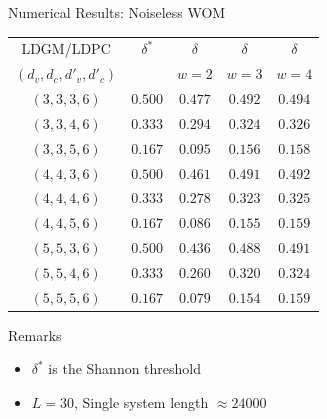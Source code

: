 \documentclass[10pt]{beamer}
\begin{document}
\begin{frame}{Numerical Results: Noiseless WOM}
\begin{center}
\begin{tabular}{|c|c|c|c|c|}
\hline
LDGM/LDPC & $\delta^{*}$ & $\delta$ & $\delta$ & $\delta$ \\
$(d_v,d_c,d'_v,d'_c)$ & & $w=2$ & $w=3$ & $w=4$ \\
\hline
$(3,3,3,6)$  & $0.500$ & $0.477$ & $0.492$ & $0.494$\\
$(3,3,4,6)$  & $0.333$ & $0.294$ & $0.324$ & $0.326$\\
$(3,3,5,6)$  & $0.167$ & $0.095$ & $0.156$ & $0.158$\\
$(4,4,3,6)$  & $0.500$ & $0.461$ & $0.491$ & $0.492$\\
$(4,4,4,6)$  & $0.333$ & $0.278$ & $0.323$ & $0.325$\\
$(4,4,5,6)$  & $0.167$ & $0.086$ & $0.155$ & $0.159$\\
$(5,5,3,6)$  & $0.500$ & $0.436$ & $0.488$ & $0.491$\\
$(5,5,4,6)$  & $0.333$ & $0.260$ & $0.320$ & $0.324$\\
$(5,5,5,6)$  & $0.167$ & $0.079$ & $0.154$ & $0.159$\\
\hline  
\end{tabular}
\end{center}
\begin{block}{Remarks}
  \begin{itemize}
  \item $\delta^*$ is the Shannon threshold
  \item $L=30$, Single system length $\approx 24000$
  \end{itemize}
\end{block}
\end{frame}
\end{document}
